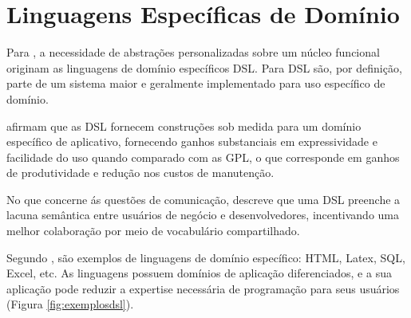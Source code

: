 \section{Linguagens Específicas de Domínio}
\label{sec:dsl}

Para , a necessidade de abstrações personalizadas sobre um núcleo funcional originam as linguagens de domínio específicos \gls{DSL}. Para  \gls{DSL} são, por definição, parte de um sistema maior e geralmente implementado para uso específico de domínio.

 afirmam que as \gls{DSL} fornecem construções sob medida para um domínio específico de aplicativo, fornecendo ganhos substanciais em expressividade e facilidade do uso quando comparado com as \gls{GPL}, o que corresponde em ganhos de produtividade e redução nos custos de manutenção.

No que concerne ás questões de comunicação,  descreve que uma \gls{DSL} preenche a lacuna semântica entre usuários de negócio e desenvolvedores, incentivando uma melhor colaboração por meio de vocabulário compartilhado.  

Segundo , são exemplos de linguagens de domínio específico: HTML, Latex, SQL, Excel, etc. As linguagens possuem domínios de aplicação diferenciados, e a sua aplicação pode reduzir a expertise necessária de programação para seus usuários (Figura \ref{fig:exemplosdsl}).






